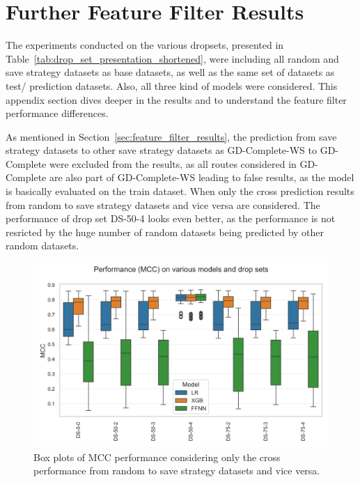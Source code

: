 \clearpage
\section{Further Feature Filter Results}
\label{app:sec:further_feature_filter}

The experiments conducted on the various dropsets, presented in Table~\ref{tab:drop_set_presentation_shortened}, were including
all random and save strategy datasets as base datasets, as well as the same set of datasets as test/ prediction datasets. Also, all three
kind of models were considered. This appendix section dives deeper in the results and to understand the feature filter performance differences.

As mentioned in Section~\ref{sec:feature_filter_results}, the prediction from save strategy datasets to other save strategy datasets as
GD-Complete-WS to GD-Complete were excluded from the results, as all routes considered in GD-Complete are also part of GD-Complete-WS leading to
false results, as the model is basically evaluated on the train dataset. When only the cross prediction results from random to save strategy
datasets and vice versa are considered. The performance of drop set DS-50-4 looks even better, as the performance is not resricted by the huge number
of random datasets being predicted by other random datasets.

\begin{figure}[ht]
    \centering
    \includegraphics[width = .95\textwidth]{pictures/feature_filter/cross_performance_boxplot.png}
    \caption{Box plots of MCC performance considering only the cross performance from random to save strategy datasets and vice versa.}
    \label{fig:mcc_filter_results_cross}
\end{figure}

